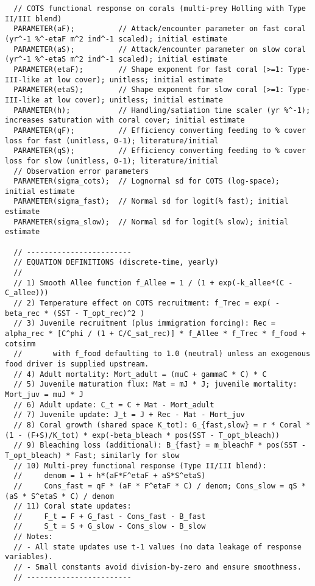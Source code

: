 \begin{lstlisting}
  // COTS functional response on corals (multi-prey Holling with Type II/III blend)
  PARAMETER(aF);          // Attack/encounter parameter on fast coral (yr^-1 %^-etaF m^2 ind^-1 scaled); initial estimate
  PARAMETER(aS);          // Attack/encounter parameter on slow coral (yr^-1 %^-etaS m^2 ind^-1 scaled); initial estimate
  PARAMETER(etaF);        // Shape exponent for fast coral (>=1: Type-III-like at low cover); unitless; initial estimate
  PARAMETER(etaS);        // Shape exponent for slow coral (>=1: Type-III-like at low cover); unitless; initial estimate
  PARAMETER(h);           // Handling/satiation time scaler (yr %^-1); increases saturation with coral cover; initial estimate
  PARAMETER(qF);          // Efficiency converting feeding to % cover loss for fast (unitless, 0-1); literature/initial
  PARAMETER(qS);          // Efficiency converting feeding to % cover loss for slow (unitless, 0-1); literature/initial
  // Observation error parameters
  PARAMETER(sigma_cots);  // Lognormal sd for COTS (log-space); initial estimate
  PARAMETER(sigma_fast);  // Normal sd for logit(% fast); initial estimate
  PARAMETER(sigma_slow);  // Normal sd for logit(% slow); initial estimate

  // ------------------------
  // EQUATION DEFINITIONS (discrete-time, yearly)
  //
  // 1) Smooth Allee function f_Allee = 1 / (1 + exp(-k_allee*(C - C_allee)))
  // 2) Temperature effect on COTS recruitment: f_Trec = exp( -beta_rec * (SST - T_opt_rec)^2 )
  // 3) Juvenile recruitment (plus immigration forcing): Rec = alpha_rec * [C^phi / (1 + C/C_sat_rec)] * f_Allee * f_Trec * f_food + cotsimm
  //       with f_food defaulting to 1.0 (neutral) unless an exogenous food driver is supplied upstream.
  // 4) Adult mortality: Mort_adult = (muC + gammaC * C) * C
  // 5) Juvenile maturation flux: Mat = mJ * J; juvenile mortality: Mort_juv = muJ * J
  // 6) Adult update: C_t = C + Mat - Mort_adult
  // 7) Juvenile update: J_t = J + Rec - Mat - Mort_juv
  // 8) Coral growth (shared space K_tot): G_{fast,slow} = r * Coral * (1 - (F+S)/K_tot) * exp(-beta_bleach * pos(SST - T_opt_bleach))
  // 9) Bleaching loss (additional): B_{fast} = m_bleachF * pos(SST - T_opt_bleach) * Fast; similarly for slow
  // 10) Multi-prey functional response (Type II/III blend):
  //     denom = 1 + h*(aF*F^etaF + aS*S^etaS)
  //     Cons_fast = qF * (aF * F^etaF * C) / denom; Cons_slow = qS * (aS * S^etaS * C) / denom
  // 11) Coral state updates:
  //     F_t = F + G_fast - Cons_fast - B_fast
  //     S_t = S + G_slow - Cons_slow - B_slow
  // Notes:
  // - All state updates use t-1 values (no data leakage of response variables).
  // - Small constants avoid division-by-zero and ensure smoothness.
  // ------------------------


\end{lstlisting}
